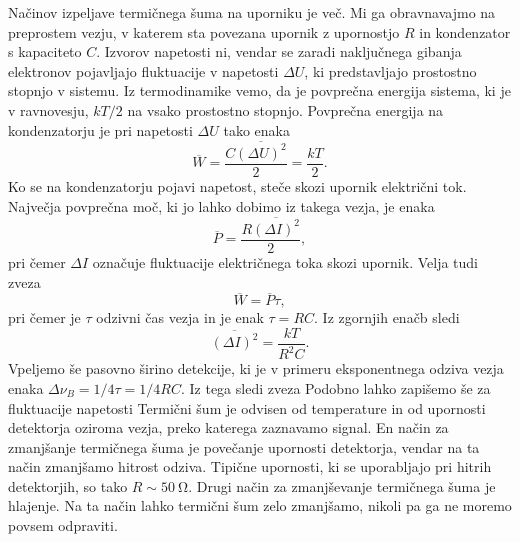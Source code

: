 Načinov izpeljave termičnega šuma na uporniku je več. Mi ga obravnavajmo na preprostem vezju, 
v katerem sta povezana upornik z upornostjo $R$ in kondenzator s kapaciteto $C$. Izvorov 
napetosti ni, vendar se zaradi naključnega gibanja elektronov pojavljajo fluktuacije v 
napetosti $\Delta U$, ki predstavljajo prostostno stopnjo v sistemu.  
Iz termodinamike vemo, da je povprečna energija sistema, ki je v 
ravnovesju, $kT/2$ na vsako prostostno stopnjo. Povprečna energija na kondenzatorju 
je pri napetosti $\Delta U$ tako enaka
\begin{equation}
\overline{W} = \frac{C\overline{(\Delta U)^2}}{2} = \frac{kT}{2}.
\end{equation}
Ko se na kondenzatorju pojavi napetost, steče skozi upornik električni tok. 
Največja povprečna moč, ki jo lahko dobimo iz takega vezja, je enaka 
\begin{equation}
\overline{P} = \frac{R \overline{(\Delta I)^2}}{2},
\end{equation}
pri čemer $\Delta I$ označuje fluktuacije električnega toka skozi upornik.
Velja tudi zveza
\begin{equation}
\overline{W} = \overline{P}\tau,
\end{equation}
pri čemer je $\tau$ odzivni čas vezja in je enak $\tau = RC$. Iz zgornjih 
enačb sledi 
\begin{equation}
\overline{(\Delta I)^2} = \frac{kT}{R^2C}.
\end{equation}
Vpeljemo še pasovno širino detekcije, ki je v primeru eksponentnega odziva vezja enaka
$\Delta \nu_B = 1/4\tau = 1/4RC$. Iz tega sledi zveza
Podobno lahko zapišemo še za fluktuacije napetosti 
Termični šum je odvisen od temperature in od upornosti detektorja oziroma
vezja, preko katerega zaznavamo signal. En način za zmanjšanje termičnega šuma
je povečanje upornosti detektorja, vendar na ta način zmanjšamo hitrost
odziva. Tipične upornosti, ki se uporabljajo pri hitrih detektorjih, so 
tako $R \sim 50~\si{\ohm}$. Drugi način za zmanjševanje termičnega šuma je
hlajenje. Na ta način lahko termični šum zelo zmanjšamo, nikoli pa ga ne moremo povsem
odpraviti.  

